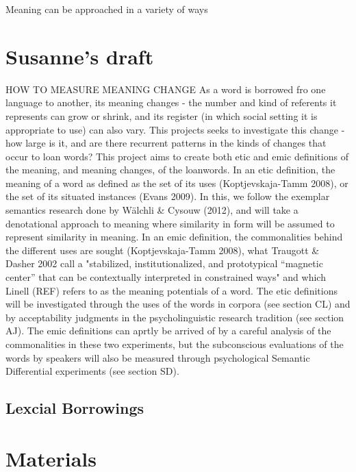\documentclass[a4paper]{article}
\begin{document}
Meaning can be approached in a variety of ways \cite{Koptjevskaja-Tamm2008}


\section{Susanne's draft}
HOW TO MEASURE MEANING CHANGE
As a word is borrowed fro one language to another, its meaning changes - the number and kind of referents it represents can grow or shrink, and its register (in which social setting it is appropriate to use) can also vary. This projects seeks to investigate this change - how large is it, and are there recurrent patterns in the kinds of changes that occur to loan words? 
This project aims to create both etic and emic definitions of the meaning, and meaning changes, of the loanwords. In an etic definition, the meaning of a word as defined as the set of its uses (Koptjevskaja-Tamm 2008), or the set of its situated instances (Evans 2009). In this, we follow the exemplar semantics research done by Wälchli \& Cysouw (2012), and will take a denotational approach to meaning where similarity in form will be assumed to represent similarity in meaning. In an emic definition, the commonalities behind the different uses are sought (Koptjevskaja-Tamm 2008), what Traugott \& Dasher 2002 call a "stabilized, institutionalized, and prototypical “magnetic center” that can be contextually interpreted in constrained ways" and which Linell (REF) refers to as the meaning potentials of a word.
The etic definitions will be investigated through the uses of the words in corpora (see section CL) and by acceptability judgments in the psycholinguistic research tradition (see section AJ). The emic definitions can aprtly be arrived of by a careful analysis of the commonalities in these two experiments, but the subconscious evaluations of the words by speakers will also be measured through psychological Semantic Differential experiments (see section SD).


\subsection{Lexcial Borrowings}

\cite{Matras2009}

\section{Materials} 
\end{document}
